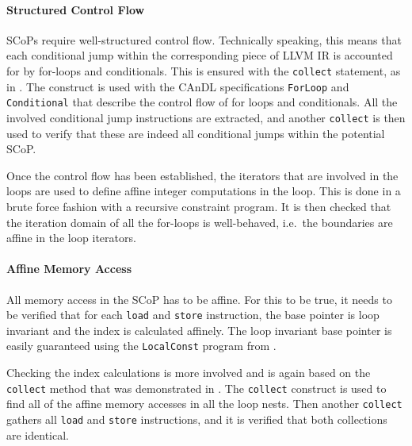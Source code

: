     \paragraph*{Structured Control Flow}
    SCoPs require well-structured control flow.
    Technically speaking, this means that each conditional jump within the
    corresponding piece of LLVM IR is accounted for by for-loops and
    conditionals.
    This is ensured with the \texttt{collect} statement, as in
    .
    The construct is used with the CAnDL specifications \texttt{ForLoop} and
    \texttt{Conditional} that describe the control flow of for loops and
    conditionals.
    All the involved conditional jump instructions are extracted, and  another
    \texttt{collect} is then used to verify that these are indeed all
    conditional jumps within the potential SCoP.

    Once the control flow has been established, the iterators that are
    involved in the loops are used to define affine integer computations in the
    loop.
    This is done in a brute force fashion with a recursive constraint program.
    It is then checked that the iteration domain of all the for-loops is
    well-behaved, i.e.\ the boundaries are affine in the loop iterators.

    \paragraph*{Affine Memory Access}
    All memory access in the SCoP has to be affine.
    For this to be true, it needs to be verified that for each {\tt load} and
    {\tt store} instruction, the base pointer is loop invariant and the index is
    calculated affinely.
    The loop invariant base pointer is easily guaranteed using the
    \texttt{LocalConst} program from .

    Checking the index calculations is more involved and is again based on the
    {\tt collect} method that was demonstrated in .
    The {\tt collect} construct is used to find all of the affine memory
    accesses in all the loop nests.
    Then another {\tt collect} gathers all \texttt{load} and \texttt{store}
    instructions, and it is verified that both collections are identical.

